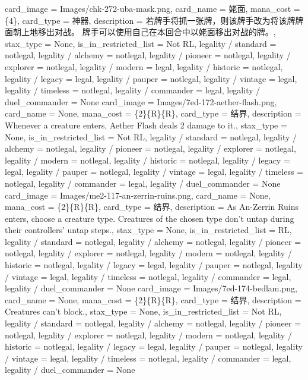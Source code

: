 \documentclass[lang = cn, color = black, 10pt]{AllThatStax}
\begin{document}
\card
{
	card_image = Images/chk-272-uba-mask.png,
	card_name = 姥面,
	mana_cost = \{4\},
	card_type = 神器,
	description = 若牌手将抓一张牌，则该牌手改为将该牌牌面朝上地移出对战。
	牌手可以使用自己在本回合中以姥面移出对战的牌。,
	stax_type = None,
	is_in_restricted_list = Not RL,
	legality / standard = notlegal,
	legality / alchemy = notlegal,
	legality / pioneer = notlegal,
	legality / explorer = notlegal,
	legality / modern = legal,
	legality / historic = notlegal,
	legality / legacy = legal,
	legality / pauper = notlegal,
	legality / vintage = legal,
	legality / timeless = notlegal,
	legality / commander = legal,
	legality / duel_commander = None
}
\card
{
	card_image = Images/7ed-172-aether-flash.png,
	card_name = None,
	mana_cost = \{2\}\{R\}\{R\},
	card_type = 结界,
	description = Whenever a creature enters, Aether Flash deals 2 damage to it.,
	stax_type = None,
	is_in_restricted_list = Not RL,
	legality / standard = notlegal,
	legality / alchemy = notlegal,
	legality / pioneer = notlegal,
	legality / explorer = notlegal,
	legality / modern = notlegal,
	legality / historic = notlegal,
	legality / legacy = legal,
	legality / pauper = notlegal,
	legality / vintage = legal,
	legality / timeless = notlegal,
	legality / commander = legal,
	legality / duel_commander = None
}
\card
{
	card_image = Images/me2-117-an-zerrin-ruins.png,
	card_name = None,
	mana_cost = \{2\}\{R\}\{R\},
	card_type = 结界,
	description = As An-Zerrin Ruins enters, choose a creature type.
	Creatures of the chosen type don't untap during their controllers' untap steps.,
	stax_type = None,
	is_in_restricted_list = RL,
	legality / standard = notlegal,
	legality / alchemy = notlegal,
	legality / pioneer = notlegal,
	legality / explorer = notlegal,
	legality / modern = notlegal,
	legality / historic = notlegal,
	legality / legacy = legal,
	legality / pauper = notlegal,
	legality / vintage = legal,
	legality / timeless = notlegal,
	legality / commander = legal,
	legality / duel_commander = None
}
\card
{
	card_image = Images/7ed-174-bedlam.png,
	card_name = None,
	mana_cost = \{2\}\{R\}\{R\},
	card_type = 结界,
	description = Creatures can't block.,
	stax_type = None,
	is_in_restricted_list = Not RL,
	legality / standard = notlegal,
	legality / alchemy = notlegal,
	legality / pioneer = notlegal,
	legality / explorer = notlegal,
	legality / modern = notlegal,
	legality / historic = notlegal,
	legality / legacy = legal,
	legality / pauper = notlegal,
	legality / vintage = legal,
	legality / timeless = notlegal,
	legality / commander = legal,
	legality / duel_commander = None
}
\card
\end{document}
